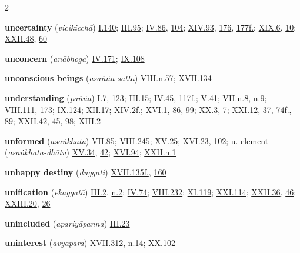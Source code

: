 \begin{multicols}{2}
\begin{vismHanging}
\par\textbf{uncertainty} (\emph{vicikicchā}) \hyperlink{I.140}{I.140}{}; \hyperlink{III.95}{III.95}{}; \hyperlink{IV.86}{IV.86}{}, \hyperlink{IV.104}{104}{}; \hyperlink{XIV.93}{XIV.93}{}, \hyperlink{XIV.176}{176}{}, \hyperlink{XIV.177}{177f.}{}; \hyperlink{XIX.6}{XIX.6}{}, \hyperlink{XIX.10}{10}{}; \hyperlink{XXII.48}{XXII.48}{}, \hyperlink{XXII.60}{60}{}
\par\textbf{unconcern} (\emph{anābhoga}) \hyperlink{IV.171}{IV.171}{}; \hyperlink{IX.108}{IX.108}{}
\par\textbf{unconscious beings} (\emph{asañña-satta}) \hyperlink{VIII.n57}{VIII.n.57}{}; \hyperlink{XVII.134}{XVII.134}{}
\par\textbf{understanding} (\emph{paññā}) \hyperlink{I.7}{I.7}{}, \hyperlink{I.123}{123}{}; \hyperlink{III.15}{III.15}{}; \hyperlink{IV.45}{IV.45}{}, \hyperlink{IV.117}{117f.}{}; \hyperlink{V.41}{V.41}{}; \hyperlink{VII.n8}{VII.n.8}{}, \hyperlink{VII.n9}{n.9}{}; \hyperlink{VIII.111}{VIII.111}{}, \hyperlink{VIII.173}{173}{}; \hyperlink{IX.124}{IX.124}{}; \hyperlink{XII.17}{XII.17}{}; \hyperlink{XIV.2}{XIV.2f.}{}; \hyperlink{XVI.1}{XVI.1}{}, \hyperlink{XVI.86}{86}{}, \hyperlink{XVI.99}{99}{}; \hyperlink{XX.3}{XX.3}{}, \hyperlink{XX.7}{7}{}; \hyperlink{XXI.12}{XXI.12}{}, \hyperlink{XXI.37}{37}{}, \hyperlink{XXI.74}{74f.}{}, \hyperlink{XXI.89}{89}{}; \hyperlink{XXII.42}{XXII.42}{}, \hyperlink{XXII.45}{45}{}, \hyperlink{XXII.98}{98}{}; \hyperlink{XIII.2}{XIII.2}{}
\par\textbf{unformed} (\emph{asaṅkhata}) \hyperlink{VII.85}{VII.85}{}; \hyperlink{VIII.245}{VIII.245}{}; \hyperlink{XV.25}{XV.25}{}; \hyperlink{XVI.23}{XVI.23}{}, \hyperlink{XVI.102}{102}{}; u. element (\emph{asaṅkhata-dhātu}) \hyperlink{XV.34}{XV.34}{}, \hyperlink{XV.42}{42}{}; \hyperlink{XVI.94}{XVI.94}{}; \hyperlink{XXII.n1}{XXII.n.1}{}
\par\textbf{unhappy destiny} (\emph{duggati}) \hyperlink{XVII.135}{XVII.135f.}{}, \hyperlink{XVII.160}{160}{}
\par\textbf{unification} (\emph{ekaggatā}) \hyperlink{III.2}{III.2}{}, \hyperlink{III.n2}{n.2}{}; \hyperlink{IV.74}{IV.74}{}; \hyperlink{VIII.232}{VIII.232}{}; \hyperlink{XI.119}{XI.119}{}; \hyperlink{XXI.114}{XXI.114}{}; \hyperlink{XXII.36}{XXII.36}{}, \hyperlink{XXII.46}{46}{}; \hyperlink{XXIII.20}{XXIII.20}{}, \hyperlink{XXIII.26}{26}{}
\par\textbf{unincluded} (\emph{apariyāpanna}) \hyperlink{III.23}{III.23}{}
\par\textbf{uninterest} (\emph{avyāpāra}) \hyperlink{XVII.312}{XVII.312}{}, \hyperlink{XVII.n14}{n.14}{}; \hyperlink{XX.102}{XX.102}{}

\end{vismHanging}
\end{multicols}
